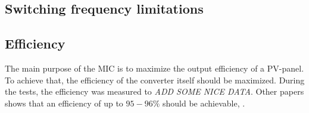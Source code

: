 \subsection{Switching frequency limitations}


\subsection{Efficiency}
The main purpose of the MIC is to maximize the output efficiency of a PV-panel. To achieve that, the efficiency of the converter itself should be maximized. During the tests, the efficiency was measured to \textit{ADD SOME NICE DATA}. Other papers shows that an efficiency of up to $95-96\%$ should be achievable\cite{underthehood}, \cite{efficient_buckboost}. 